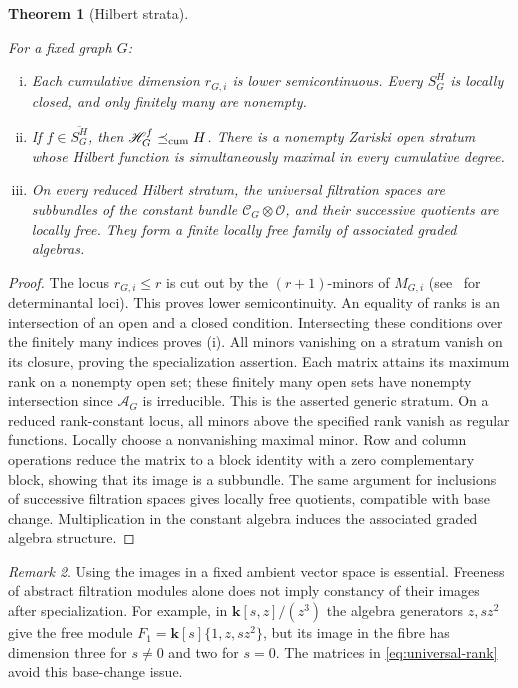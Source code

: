 \documentclass[reqno]{article}
\theoremstyle{plain} %
\newtheorem{theorem}{Theorem}[section]
\theoremstyle{definition}
\theoremstyle{remark}
\newtheorem{remark}[theorem]{\sc Remark}
\newcommand{\K} {\mathbf{k}}
\newcommand {\CC}{\mathscr{C}}
\newcommand{\cA}{{\mathscr{A}}}
\newcommand{\hs}{\mathscr{H}}
\numberwithin{equation}{section}
\begin{document}
\begin{theorem}[Hilbert strata]\label{thm:determinantal-strata}

For a fixed graph $G$:
\begin{enumerate}[(i)]
\item Each cumulative dimension $r_{G,i}$ is lower semicontinuous.
Every $S_G^H$ is locally closed, and only finitely many are nonempty.
\item If $f\in\overline{S_G^H}$, then
$\hs_G^f\preceq_{\rm cum}H$.
There is a nonempty Zariski open stratum whose Hilbert function is
simultaneously maximal in every cumulative degree.
\item On every reduced Hilbert stratum, the universal filtration spaces
are subbundles of the constant bundle $\CC_G\otimes\mathcal O$,
and their successive quotients are locally free. They form a finite
locally free family of associated graded algebras.
\end{enumerate}
\end{theorem}
\begin{proof}
The locus $r_{G,i}\le r$ is cut out by the $(r+1)$-minors of $M_{G,i}$
(see~\cite{BV} for determinantal loci).
This proves lower semicontinuity. An equality of ranks is an intersection
of an open and a closed condition. Intersecting these conditions over the
finitely many indices proves (i).
All minors vanishing on a stratum vanish on its closure, proving the
specialization assertion. Each matrix attains its maximum rank on a
nonempty open set; these finitely many open sets have nonempty
intersection since $\cA_G$ is irreducible. This is the asserted generic
stratum.
On a reduced rank-constant locus, all minors above the specified rank
vanish as regular functions. Locally choose a nonvanishing maximal
minor. Row and column operations reduce the matrix to a block identity
with a zero complementary block, showing that its image is a subbundle.
The same argument for inclusions of successive filtration spaces gives
locally free quotients, compatible with base change. Multiplication in
the constant algebra induces the associated graded algebra structure.
\end{proof}

\begin{remark}
Using the images in a fixed ambient vector space is essential. Freeness
of abstract filtration modules alone does not imply constancy of their
images after specialization. For example, in
$\K[s,z]/(z^3)$ the algebra generators $z,sz^2$ give the free module
$F_1=\K[s]\{1,z,sz^2\}$, but its image in the fibre has dimension three
for $s\ne0$ and two for $s=0$. The matrices in
\eqref{eq:universal-rank} avoid this base-change issue.
\end{remark}
\end{document}
